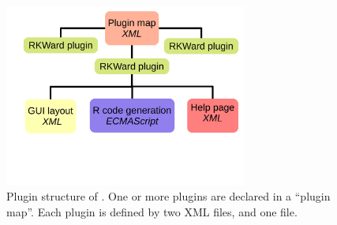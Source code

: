 \begin{figure}[t!]
 \centering
 \includegraphics[clip=true,trim=0cm 6cm 0cm 0cm,width=8cm]{../figures/plugin_structure.pdf}
 \caption{Plugin structure of . One or more plugins are declared in a ``plugin map''. Each plugin is defined by
 two XML files, and one  file.}
 \label{fig:plugin_structure}
\end{figure}


